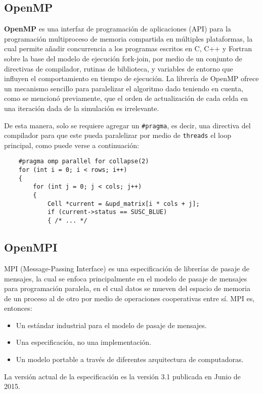 \documentclass[a4paper,12pt]{article}
\begin{document}
\subsection{OpenMP}

\textbf{OpenMP} es una interfaz de programación de aplicaciones (API) para la programación multiproceso de memoria compartida en múltiples plataformas, la cual permite añadir concurrencia a los programas escritos en C, C++ y Fortran sobre la base del modelo de ejecución fork-join, por medio de un conjunto de directivas de compilador, rutinas de biblioteca, y variables de entorno que influyen el comportamiento en tiempo de ejecución.
\newpage
La librería de OpenMP ofrece un mecanismo sencillo para paralelizar el algoritmo dado teniendo en cuenta, como se mencionó previamente, que el orden de actualización de cada celda en una iteración dada de la simulación es irrelevante.

De esta manera, solo se requiere agregar un \verb|#pragma|, es decir, una directiva del compilador para que este pueda paralelizar por medio de \verb|threads| el loop principal, como puede verse a continuación:

\begin{verbatim}
    #pragma omp parallel for collapse(2)
    for (int i = 0; i < rows; i++)
    {
        for (int j = 0; j < cols; j++)
        {
            Cell *current = &upd_matrix[i * cols + j];
            if (current->status == SUSC_BLUE)
            { /* ... */
\end{verbatim}

\subsection{OpenMPI}

MPI (Message-Passing Interface) es una especificación de librerías de pasaje de mensajes, la cual se enfoca principalmente en el modelo de pasaje de mensajes para programación paralela, en el cual datos se mueven del espacio de memoria de un proceso al de otro por medio de operaciones cooperativas entre sí. MPI es, entonces:
\begin{itemize}
    \item Un estándar industrial para el modelo de pasaje de mensajes.
    \item Una especificación, no una implementación.
    \item Un modelo portable a través de diferentes arquitectura de computadoras.
\end{itemize}
La versión actual de la especificación es la versión 3.1 publicada en Junio de 2015.
\end{document}
